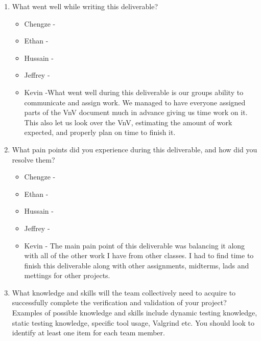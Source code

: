 \documentclass[12pt, titlepage]{article}
\begin{document}
\begin{enumerate}
  \item What went well while writing this deliverable?
  \begin{itemize}
    \item Chengze -
    \item Ethan -
    \item Hussain -
    \item Jeffrey -
    \item Kevin -What went well during this deliverable is our groups ability to communicate and assign work. We managed to have everyone assigned parts of the VnV document much in advance giving us time work on it. This also let us look over the VnV, estimating the amount of work expected, and properly plan on time to finish it.
  \end{itemize}
  \item What pain points did you experience during this deliverable, and how
    did you resolve them?
  \begin{itemize}
    \item Chengze -
    \item Ethan -
    \item Hussain -
    \item Jeffrey -
    \item Kevin - The main pain point of this deliverable was balancing it along with all of the other work I have from other classes. I had to find time to finish this deliverable along with other assignments, midterms, lads and mettings for other projects.
  \end{itemize}
  \item What knowledge and skills will the team collectively need to acquire to
  successfully complete the verification and validation of your project?
  Examples of possible knowledge and skills include dynamic testing knowledge,
  static testing knowledge, specific tool usage, Valgrind etc.  You should look to
  identify at least one item for each team member.


\end{enumerate}
\end{document}
